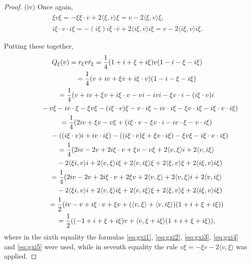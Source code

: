 \documentclass[pdftex]{sigma}
\numberwithin{equation}{section}
\begin{document}
\begin{proof}
(iv) Once again,
 \begin{gather}
 \xi v \xi =-\xi\overline{\xi}\cdot\overline{v}+2\langle\xi,\overline{v}\rangle\xi=v-2\langle\xi,v\rangle\xi, \label{eq:gxi4}\\
 i\xi \cdot v\cdot i\xi =-(i\xi)\overline{i\xi}\cdot\overline{v}+2\langle i\xi,\overline{v}\rangle i\xi=v-2\langle i\xi,v\rangle i\xi. \label{eq:gxi5}
 \end{gather}

 Putting these together,
 \begin{gather*}
 Q_\xi(v) = r_\xi v\bar{r}_\xi=\frac{1}{4}(1+i+\xi+i\xi)v(1-i-\xi-i\xi)\\
 \hphantom{Q_\xi(v)}{} = \frac{1}{4}(v+iv+\xi v+i\xi \cdot v)(1-i-\xi-i\xi)\\
\hphantom{Q_\xi(v)}{}= \frac{1}{4}(v+iv+\xi v+i\xi\cdot v -v i-ivi-\xi v\cdot i-(i\xi\cdot v)i\\
\hphantom{Q_\xi(v)=}{} -v\xi-iv\cdot\xi-\xi v\xi-(i\xi\cdot v)\xi-v\cdot i\xi-iv\cdot i\xi-\xi v\cdot i\xi-i\xi\cdot v\cdot i\xi)\\
\hphantom{Q_\xi(v)}{}= \frac{1}{4}(2iv+\xi v-v\xi+(i\xi \cdot v-\xi v \cdot i- iv\cdot \xi-v\cdot i\xi) \\
\hphantom{Q_\xi(v)=}{} -((i\xi\cdot v)i + i v \cdot i\xi )-((i\xi\cdot v)\xi+\xi v\cdot i\xi)-\xi v \xi - i\xi \cdot v \cdot i\xi)\\
\hphantom{Q_\xi(v)}{}= \frac{1}{4}(2iv-2v+2i\xi\cdot v +\xi v-v\xi +2 \langle v,\xi \rangle i+2\langle v, i\xi \rangle\\
\hphantom{Q_\xi(v)=}{} -2 \langle\xi i,v \rangle i+2 \langle v,\xi \rangle i\xi+2\langle v,i\xi \rangle \xi+ 2\langle \xi,v\rangle \xi+2 \langle i\xi,v\rangle i\xi)\\
\hphantom{Q_\xi(v)}{}= \frac{1}{4}(2iv-2v+2i\xi\cdot v +2\xi v+2 \langle v,\xi \rangle +2 \langle v,\xi \rangle i+2\langle v, i\xi \rangle\\
\hphantom{Q_\xi(v)=}{} -2 \langle\xi i,v \rangle i+2 \langle v,\xi \rangle i\xi+2\langle v,i\xi \rangle \xi+ 2\langle \xi,v\rangle \xi+2 \langle i\xi,v\rangle i\xi)\\
\hphantom{Q_\xi(v)}{}= \frac{1}{2}(iv-v+i\xi\cdot v+\xi v+ (\langle v, \xi \rangle + \langle v, i\xi \rangle )(1+i+\xi+i\xi))\\
\hphantom{Q_\xi(v)}{}= \frac{1}{2}((-1+i+\xi+i\xi) v + \langle v, \xi + i\xi \rangle (1+i+\xi+i\xi)),
 \end{gather*}
 where in the sixth equality the formulas \eqref{eq:gxi1}, \eqref{eq:gxi2}, \eqref{eq:gxi3}, \eqref{eq:gxi4} and \eqref{eq:gxi5} were used, while in seventh equality the rule $v\xi=-\xi v-2 \langle v,\xi \rangle$ was applied.
\end{proof}
\end{document}
